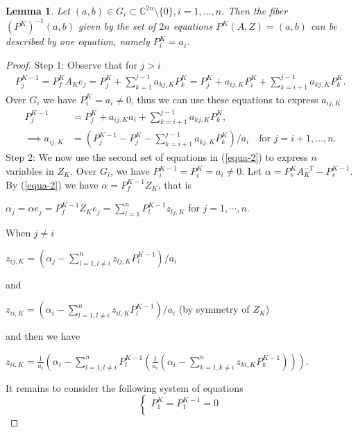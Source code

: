 \documentclass[10pt]{amsart}
\newtheorem{lemm}[theo]{Lemma}
\theoremstyle{remark}
\begin{document}
\begin{lemm}\label{red-1}
Let $(a,b)\in G_i \subset \mathbb{C}^{2n}\setminus \{0\}, i = 1, \dots, n$. Then the fiber $(P^K)^{-1}(a,b)$ given by the set of $2n$ equations $P^K(A,Z) = (a, b)$ can be described by one equation, namely $P^K_i = a_i$.
\end{lemm}
\begin{proof}
    Step 1: Observe that for $j>i$
    \begin{align*}
        P^{K-1}_j = P^K_f A_K e_j = P^K_j+\sum_{k=1}^{j-1} a_{kj,K}P_k^K 
        = P^K_j+a_{ij,K}P_i^K+\sum_{k=i+1}^{j-1} a_{kj,K}P_k^K. 
    \end{align*}
Over $G_i$ we have $P^{K}_i = a_i \neq 0$, thus we can use these equations to express $a_{ij,K}$
\begin{align*}
    P^{K-1}_j &= P^K_j + a_{ij,K} a_i + \sum_{k=i+1}^{j-1} a_{kj,K}P_k^K, \\
    \implies a_{ij,K} &=(P^{K-1}_j-P^K_j-\sum_{k=i+1}^{j-1} a_{kj,K}P_k^K)/a_i \quad \text{for } j = i+1, \dots, n.
\end{align*}
Step 2: We now use the second set of equations in (\ref{equa-2}) to express $n$ variables in $Z_K$. Over $G_i$, we have $P^{K-1}_i = P^K_i = a_i \neq 0$. Let $\alpha = P^K_s A^{-T}_K-P^{K-1}_s$.
By (\ref{equa-2}) we have $\alpha = P^{K-1}_f Z_K$, that is
\begin{center}
    $\alpha_j = \alpha e_j = P^{K-1}_f Z_K e_j = \sum^n_{l=1} P^{K-1}_l z_{lj,K} $ for $j = 1, \cdots,n$.
\end{center}
When $j \neq i$
\begin{center}
    $z_{ij,K}= (\alpha_j-\sum^n_{l=1,l\neq i}z_{lj,K}P^{K-1}_l)/a_i $
\end{center}
and
\begin{center}
   $z_{ii,K} = (\alpha_i-\sum^n_{l=1,l\neq i}z_{il,K}P^{K-1}_l)/a_i$ (by symmetry of $Z_K$)
\end{center}
and then we have
\begin{center}
    $z_{ii,K}= \frac{1}{a_i}(\alpha_i-\sum^n_{l=1,l\neq i}P^{K-1}_l(\frac{1}{a_i}(\alpha_i-\sum^n_{k=1,k\neq i}z_{ki,K}P^{K-1}_k)))$.
\end{center}
It remains to consider the following system of equations
\begin{equation}
    \begin{cases}
    P^K_1 = P^{K-1}_1=0 \\

\end{cases}
\end{equation}
\end{proof}
\end{document}
